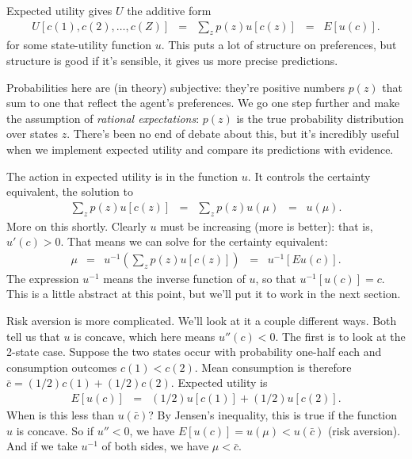 \documentclass[11pt]{article}
\newcommand{\cbar}{\bar{c}}
\begin{document}
Expected utility gives $U$ the additive form
\begin{eqnarray}
    U [c(1), c(2), \ldots, c(Z)]
            &=& \sum_z p(z) u[c(z)]  \;\;=\;\;  E [u(c)] .
\end{eqnarray}
for some state-utility function $u$.
This puts a lot of structure on preferences,
but structure is good if it's sensible,
it gives us more precise predictions.


Probabilities here are (in theory) subjective:
they're positive numbers $p(z)$ that sum to one that reflect
the agent's preferences.
We go one step further and make the assumption
of {\it rational expectations\/}:
$p(z)$ is the true probability distribution over states $z$.
There's been no end of debate about this,
but it's incredibly useful when we implement
expected utility and compare its predictions with evidence.


The action in expected utility is in the function $u$.
It controls the certainty equivalent, the solution to
\begin{eqnarray*}
    \sum_z p(z) u[c(z)]
        &=&  \sum_z p(z) u(\mu)  \;\;=\;\; u(\mu) .
\end{eqnarray*}
More on this shortly.
Clearly $u$ must be increasing (more is better):
that is, $u'(c) > 0$.
That means we can solve for the certainty equivalent:
\begin{eqnarray*}
    \mu &=& u^{-1} \left( \sum_z p(z) u[c(z)] \right)
        \;\;=\;\; u^{-1} \left[ E u(c) \right] .
\end{eqnarray*}
The expression $u^{-1}$ means the inverse function of $u$,
so that $u^{-1} [u(c)] = c $.
This is a little abstract at this point, but we'll put it to work
in the next section.


Risk aversion is more complicated.
We'll look at it a couple different ways.
Both tell us that $u$ is concave,
which here means  $u''(c) < 0$.
The first is to look at the 2-state case.
Suppose the two states occur with probability one-half each
and consumption outcomes $c(1) < c(2)$.
Mean consumption is therefore $ \cbar = (1/2)c(1) + (1/2) c(2)$.
Expected utility is
\begin{eqnarray*}
    E [u(c)] &=&  (1/2) u[c(1)] + (1/2) u[c(2)] .
\end{eqnarray*}
When is this less than $u(\cbar)$?
By Jensen's inequality, this is true if the function $u$ is concave.
So if $u'' < 0$, we have $E[u(c)] = u(\mu) < u(\cbar)$ (risk aversion).
And if we take $u^{-1}$ of both sides, we have
$\mu < \cbar$.
\end{document}

